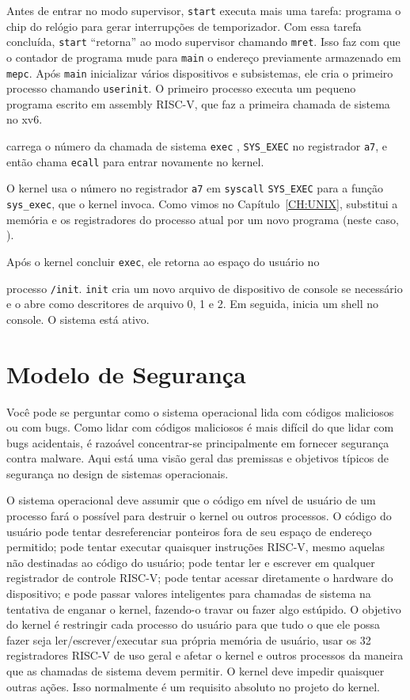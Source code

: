 Antes de entrar no modo supervisor,
\lstinline{start}
executa mais uma tarefa: programa o chip do relógio
para gerar interrupções de temporizador.
Com essa tarefa concluída,
\lstinline{start}
``retorna'' ao modo supervisor chamando
\lstinline{mret}.
Isso faz com que o contador de programa mude para
\lstinline{main}
o endereço previamente armazenado em 
\lstinline{mepc}.
Após 
\lstinline{main}
inicializar vários dispositivos e subsistemas,
ele cria o primeiro processo chamando
\lstinline{userinit}.
O primeiro processo executa um pequeno programa escrito em assembly RISC-V,
que faz a primeira chamada de sistema no xv6.

 carrega o número da chamada de sistema \lstinline{exec}
, \lstinline{SYS_EXEC}
no registrador {\tt a7},
e então chama \lstinline{ecall} para entrar novamente no kernel.

O kernel usa o número no registrador {\tt a7} em \lstinline{syscall}
\lstinline{SYS_EXEC} para a função \lstinline{sys_exec}, que o kernel
invoca. Como vimos no Capítulo~\ref{CH:UNIX}, 
substitui a memória e os registradores do processo atual por um novo
programa (neste caso, ).

Após o kernel concluir
\lstinline{exec},
ele retorna ao espaço do usuário no

processo \lstinline{/init}.
\lstinline{init}
cria um novo arquivo de dispositivo de console
se necessário
e o abre como descritores de arquivo 0, 1 e 2.
Em seguida, inicia um shell no console.
O sistema está ativo.

\section{Modelo de Segurança}

Você pode se perguntar como o sistema operacional lida com códigos maliciosos ou com bugs.
Como lidar com códigos maliciosos é mais difícil do que lidar com bugs acidentais, é razoável
concentrar-se principalmente em fornecer segurança contra malware.
Aqui está uma visão geral das premissas e
objetivos típicos de segurança no design de sistemas operacionais.

O sistema operacional deve assumir que o código em nível de usuário de um processo fará o possível para destruir o kernel ou outros processos. O código do usuário pode tentar desreferenciar ponteiros fora de seu espaço de endereço permitido; pode tentar executar quaisquer instruções RISC-V, mesmo aquelas não destinadas ao código do usuário; pode tentar ler e escrever em qualquer registrador de controle RISC-V; pode tentar acessar diretamente o hardware do dispositivo; e pode passar valores inteligentes para chamadas de sistema na tentativa de enganar o kernel, fazendo-o travar ou fazer algo estúpido. O objetivo do kernel é restringir cada processo do usuário para que tudo o que ele possa fazer seja ler/escrever/executar sua própria memória de usuário, usar os 32 registradores RISC-V de uso geral e afetar o kernel e outros processos da maneira que as chamadas de sistema devem permitir. O kernel deve impedir quaisquer outras ações. Isso normalmente é um requisito absoluto no projeto do kernel.

